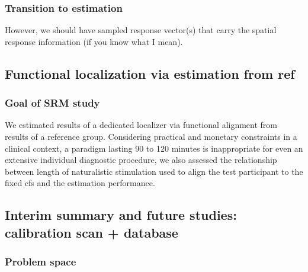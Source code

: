 \subsubsection{Transition to estimation}

%
However, we should have sampled response vector(s) that carry the spatial
response information (if you know what I mean).



\subsection{Functional localization via estimation from ref}


\subsubsection{Goal of SRM study}
We estimated results of a dedicated localizer \citep{sengupta2016extension} via
functional alignment from results of a reference group.
Considering practical and monetary constraints in a clinical context, a paradigm
lasting 90 to 120 minutes is inappropriate for even an extensive individual
diagnostic procedure, we also assessed the relationship between length of
naturalistic stimulation used to align the test participant to the fixed
\ac{cfs} and the estimation performance.



\subsection{Interim summary and future studies: calibration scan + database}






\subsubsection{Problem space}

